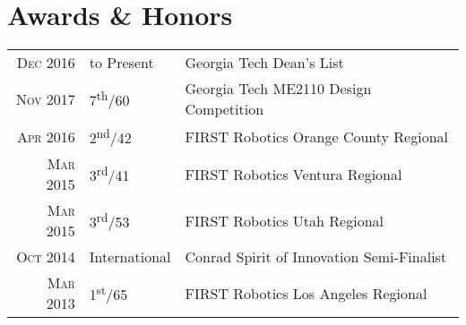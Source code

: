 \documentclass{resume}
\begin{document}
\section{Awards \& Honors}
\begin{tabular}{rll}
  \textsc{Dec} 2016 & to Present & Georgia Tech Dean's List\\
  \textsc{Nov} 2017 & 7\textsuperscript{th}/60 & Georgia Tech ME2110 Design Competition\\
  \textsc{Apr} 2016 & 2\textsuperscript{nd}/42 & FIRST Robotics Orange County Regional\\
  \textsc{Mar} 2015 & 3\textsuperscript{rd}/41 & FIRST Robotics Ventura Regional\\
  \textsc{Mar} 2015 & 3\textsuperscript{rd}/53 & FIRST Robotics Utah Regional\\
  \textsc{Oct} 2014 & International & Conrad Spirit of Innovation Semi-Finalist\\
  \textsc{Mar} 2013 & 1\textsuperscript{st}/65 & FIRST Robotics Los Angeles Regional\\
\end{tabular}
\end{document}
